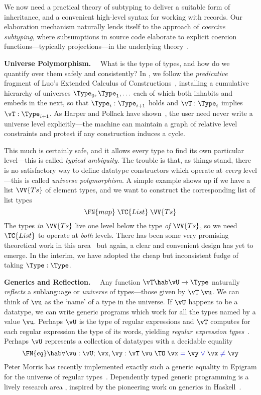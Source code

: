 \documentclass{fundam}
\begin{document}
We now need a practical theory of subtyping to deliver a suitable form
of inheritance, and a convenient high-level syntax for working with
records. Our elaboration mechanism naturally lends itself to the approach
of \emph{coercive subtyping}, where subsumptions in source code elaborate to
explicit coercion functions---typically projections---in the underlying
theory~\cite{luo:coercive}.

\textbf{Universe Polymorphism.}$\quad$ What is the type of types, and how
do we quantify over them safely and consistently? In
\cite{ConorJames:vfl}, we follow the \emph{predicative} fragment of Luo's
Extended Calculus of Constructions~\cite{luo:ecc},
installing a cumulative hierarchy of universes
$\Type_0,\Type_1,\ldots$ each of which both inhabits and embeds in the 
next, so that $\Type_i:\Type_{i+1}$ holds and $\vT:\Type_i$ implies
$\vT:\Type_{i+1}$. As Harper and Pollack have
shown~\cite{harper.pollack:universes}, the user need never
write a universe level explicitly---the machine can maintain a graph
of relative level constraints and protest if any construction induces
a cycle.

This much is certainly safe, and it allows every type to find its own
particular level---this is called \emph{typical ambiguity}. The
trouble is that, as things stand, there is no satisfactory way to
define datatype constructors which operate at \emph{every}
level---this is called \emph{universe polymorphism}. A simple example
shows up if we have a list $\VV{Ts}$ of element types, and we want to
construct the corresponding list of list types
\[
  \FN{map}\;\TC{List}\;\VV{Ts}
\]
The types \emph{in} $\VV{Ts}$ live one level below the type \emph{of}
$\VV{Ts}$, so we need $\TC{List}$ to operate at \emph{both}
levels. There has been some very promising theoretical work in this
area~\cite{paul.zhaohui:coercions.universes,courant02tphols} but
again, a clear and convenient design has yet to emerge. In the
interim, we have adopted the cheap but inconsistent fudge of taking
$\Type:\Type$.


\textbf{Generics and Reflection.}$\quad$ Any function $\vT\hab\vU\to\Type$
naturally \emph{reflects} a sublanguage or \emph{universe} of types---those
given by $\vT\;\vu$. We can think of $\vu$ as the `name' of a type in the
universe.
If $\vU$ happens to be a datatype, we can write generic programs which work
for all the types named by a value $\vu$. Perhaps $\vU$ is the type of
regular expressions and $\vT$ computes for each regular expression the
type of its words, yielding \emph{regular expression
types}~\cite{pierce.vouillon.hosoya:regular.expression.types}.
Perhaps $\vU$ represents a collection of datatypes with a decidable equality
\[
  \FN{eq}\hab\forall\vu:\vU;\,\vx,\vy:\vT\;\vu\;\TO\;
    \vx\EQ\vy\;\blue{\vee}\;\vx\;\blue{\neq}\;\vy
\]
Peter Morris has recently implemented exactly such a generic equality
in Epigram for the universe of regular types~\cite{Morris:bctcs05}.
Dependently typed generic programming is a lively research area
\cite{alti:wcgp02,benke.dybjer.jansson:universes}, inspired by the pioneering
work on generics in
Haskell~\cite{backhouse.jansson.jeuring.meertens:generic,%
              hinze.jeuring:tidts,genHaskell}.
\end{document}
